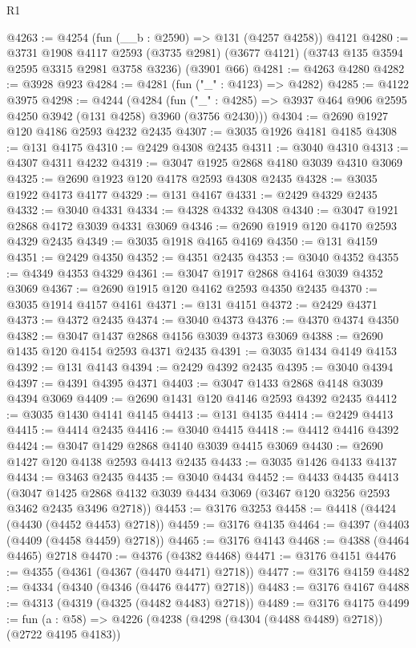 \begin{lexlean}{R1}
\begin{coremodule}
@4263 := @4254 (fun (__b : @2590) => @131 (@4257 @4258)) @4121
@4280 := @3731
    @1908
    @4117
    @2593
    (@3735 @2981)
    (@3677 @4121)
    (@3743 @135 @3594 @2595 @3315 @2981 @3758 @3236)
    (@3901 @66)
@4281 := @4263 @4280
@4282 := @3928 @923
@4284 := @4281 (fun ("_" : @4123) => @4282)
@4285 := @4122 @3975
@4298 := @4244
    (@4284
      (fun ("_" : @4285) => @3937 @464 @906 @2595 @4250 @3942 (@131 @4258) @3960 (@3756 @2430)))
@4304 := @2690 @1927 @120 @4186 @2593 @4232 @2435
@4307 := @3035 @1926 @4181 @4185
@4308 := @131 @4175
@4310 := @2429 @4308 @2435
@4311 := @3040 @4310
@4313 := @4307 @4311 @4232
@4319 := @3047 @1925 @2868 @4180 @3039 @4310 @3069
@4325 := @2690 @1923 @120 @4178 @2593 @4308 @2435
@4328 := @3035 @1922 @4173 @4177
@4329 := @131 @4167
@4331 := @2429 @4329 @2435
@4332 := @3040 @4331
@4334 := @4328 @4332 @4308
@4340 := @3047 @1921 @2868 @4172 @3039 @4331 @3069
@4346 := @2690 @1919 @120 @4170 @2593 @4329 @2435
@4349 := @3035 @1918 @4165 @4169
@4350 := @131 @4159
@4351 := @2429 @4350
@4352 := @4351 @2435
@4353 := @3040 @4352
@4355 := @4349 @4353 @4329
@4361 := @3047 @1917 @2868 @4164 @3039 @4352 @3069
@4367 := @2690 @1915 @120 @4162 @2593 @4350 @2435
@4370 := @3035 @1914 @4157 @4161
@4371 := @131 @4151
@4372 := @2429 @4371
@4373 := @4372 @2435
@4374 := @3040 @4373
@4376 := @4370 @4374 @4350
@4382 := @3047 @1437 @2868 @4156 @3039 @4373 @3069
@4388 := @2690 @1435 @120 @4154 @2593 @4371 @2435
@4391 := @3035 @1434 @4149 @4153
@4392 := @131 @4143
@4394 := @2429 @4392 @2435
@4395 := @3040 @4394
@4397 := @4391 @4395 @4371
@4403 := @3047 @1433 @2868 @4148 @3039 @4394 @3069
@4409 := @2690 @1431 @120 @4146 @2593 @4392 @2435
@4412 := @3035 @1430 @4141 @4145
@4413 := @131 @4135
@4414 := @2429 @4413
@4415 := @4414 @2435
@4416 := @3040 @4415
@4418 := @4412 @4416 @4392
@4424 := @3047 @1429 @2868 @4140 @3039 @4415 @3069
@4430 := @2690 @1427 @120 @4138 @2593 @4413 @2435
@4433 := @3035 @1426 @4133 @4137
@4434 := @3463 @2435
@4435 := @3040 @4434
@4452 := @4433
    @4435
    @4413
    (@3047 @1425 @2868 @4132 @3039 @4434 @3069 (@3467 @120 @3256 @2593 @3462 @2435 @3496 @2718))
@4453 := @3176 @3253
@4458 := @4418 (@4424 (@4430 (@4452 @4453) @2718))
@4459 := @3176 @4135
@4464 := @4397 (@4403 (@4409 (@4458 @4459) @2718))
@4465 := @3176 @4143
@4468 := @4388 (@4464 @4465) @2718
@4470 := @4376 (@4382 @4468)
@4471 := @3176 @4151
@4476 := @4355 (@4361 (@4367 (@4470 @4471) @2718))
@4477 := @3176 @4159
@4482 := @4334 (@4340 (@4346 (@4476 @4477) @2718))
@4483 := @3176 @4167
@4488 := @4313 (@4319 (@4325 (@4482 @4483) @2718))
@4489 := @3176 @4175
@4499 := fun (a : @58) => @4226 (@4238 (@4298 (@4304 (@4488 @4489) @2718)) (@2722 @4195 @4183))

\end{coremodule}
\end{lexlean}

